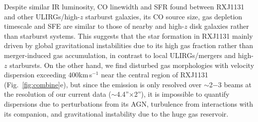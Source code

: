 \documentclass[11pt,a4paper,twoside,graphicx,color]{article}
\newcommand{\kms}{km\,s$^{-1}$\xspace}
\newcommand{\Fig}[1]{Fig.~\ref{fig:#1}}
\newcommand{\SF}{star formation\xspace}
\newcommand{\SB}{starburst\xspace}
\newcommand{\highz}{high-$z$\xspace}
\begin{document}
Despite similar IR luminosity, CO linewidth and SFR found between RXJ1131
and other ULIRGs/high-$z$ \SB galaxies, 
its CO source size, gas depletion timescale and SFE are similar to those 
of nearby and high-$z$ disk galaxies rather than \SB systems. This suggests that
the \SF in RXJ1131 
mainly driven by
global gravitational instabilities due to its high gas fraction
rather than merger-induced gas accumulation, 
in contrast to local ULIRGs/mergers and \highz starbursts. 
On the other hand, we find disturbed gas morphologies with velocity dispersion exceeding 
400\kms near the central region of RXJ1131 (\Fig{combine}e), but since
the emission is only resolved over $\sim$2$-$3 beams at the resolution of our current data ($\sim$4.4''$\times$2''),
it is impossible to quantify dispersions due to 
perturbations from its AGN,
turbulence from interactions with its companion, 
and gravitational instability due to the huge gas reservoir. %
\end{document}
